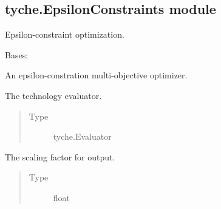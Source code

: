 \documentclass[letterpaper,10pt,english]{sphinxmanual}
\begin{document}
\subsection{tyche.EpsilonConstraints module}
\label{\detokenize{doc-src/tyche:module-tyche.EpsilonConstraints}}\label{\detokenize{doc-src/tyche:tyche-epsilonconstraints-module}}
Epsilon-constraint optimization.

\begin{fulllineitems}
\label{\detokenize{doc-src/tyche:tyche.EpsilonConstraints.EpsilonConstraintOptimizer}}
Bases: 

An epsilon-constration multi-objective optimizer.

\begin{fulllineitems}
\label{\detokenize{doc-src/tyche:tyche.EpsilonConstraints.EpsilonConstraintOptimizer.evaluator}}
The technology evaluator.
\begin{quote}\begin{description}
\item[{Type}] \leavevmode
tyche.Evaluator

\end{description}\end{quote}

\end{fulllineitems}


\begin{fulllineitems}
\label{\detokenize{doc-src/tyche:tyche.EpsilonConstraints.EpsilonConstraintOptimizer.scale}}
The scaling factor for output.
\begin{quote}\begin{description}
\item[{Type}] \leavevmode
float


\end{description}
\end{quote}
\end{fulllineitems}
\end{fulllineitems}
\end{document}
